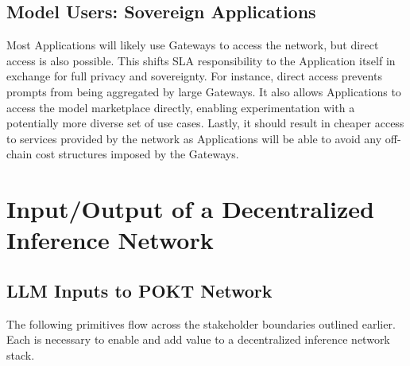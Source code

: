 \documentclass[conference,compsoc]{IEEEtran}
\begin{document}
\subsection{Model Users: Sovereign Applications}

Most Applications will likely use Gateways to access the network, but direct access is also possible. This shifts SLA responsibility to the Application itself in exchange for full privacy and sovereignty. For instance, direct access prevents prompts from being aggregated by large Gateways. It also allows Applications to access the model marketplace directly, enabling experimentation with a potentially more diverse set of use cases. Lastly, it should result in cheaper access to services provided by the network as Applications will be able to avoid any off-chain cost structures imposed by the Gateways.





\section{Input/Output of a Decentralized Inference Network}

\subsection{LLM Inputs to POKT Network}
The following primitives flow across the stakeholder boundaries outlined earlier. Each is necessary to enable and add value to a decentralized inference network stack.
\end{document}
